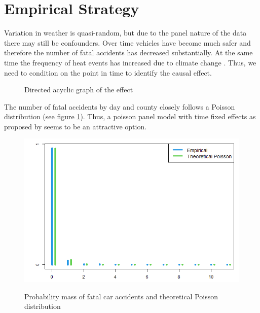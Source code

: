 
\section{Empirical Strategy}

Variation in weather is quasi-random, but due to the panel nature of the data there may still be confounders. Over time vehicles have become much safer and therefore the number of fatal accidents has decreased substantially. At the same time the frequency of heat events has increased due to climate change \citep[see e.g.][]{Habeeb_2015}. Thus, we need to condition on the point in time to identify the causal effect.


\begin{figure}[h]
	\centering
	\caption{Directed acyclic graph of the effect}
\end{figure}

The number of fatal accidents by day and county closely follows a Poisson distribution (see figure \ref{PoissonGraph}). Thus, a poisson panel model with time fixed effects as proposed by \citet{Hausman_1984} seems to be an attractive option.

\begin{figure}[h]
	\centering
	\includegraphics[scale = 0.5]{"../Code & Data/Poisson.png"}
	\label{PoissonGraph}
	\caption{Probability mass of fatal car accidents and theoretical Poisson distribution}
\end{figure}

